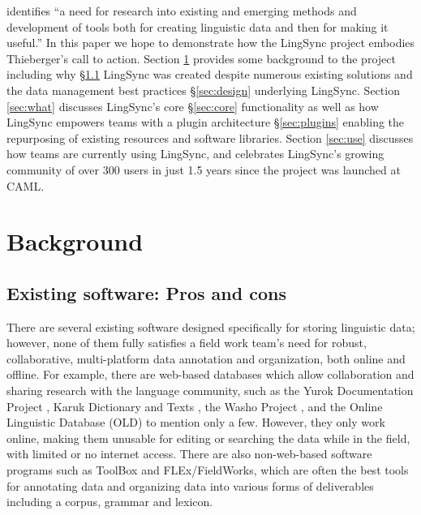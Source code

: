 \documentclass[letterpaper, 12pt, dvips]{mitwpl}
\begin{document}
\cite{Thieberger:2012} identifies ``a need for research into existing and emerging methods and development of tools both for creating linguistic data and then for making it useful.'' 
In this paper we hope to demonstrate how the LingSync project embodies Thieberger's call to action. Section \ref{sec:background} provides some background to the project including why \S \ref{sec:why} LingSync was created despite numerous existing solutions and the data management best practices \S \ref{sec:design} underlying LingSync. 
Section \ref{sec:what} discusses LingSync's core \S \ref{sec:core} functionality as well as how LingSync empowers teams  with a plugin architecture \S  \ref{sec:plugins} enabling the  repurposing of existing resources and software libraries. Section \ref{sec:use} discusses how teams are currently using LingSync, and celebrates LingSync's  growing community of over 300 users in just 1.5 years since the project was launched at CAML.


\section{Background}
\label{sec:background}



\subsection{Existing software: Pros and cons}
\label{sec:why}


There are several existing software designed specifically for storing linguistic data; however,
none of them fully satisfies a field work team's need for robust,
collaborative,
multi-platform data annotation and organization,
both online and offline.
For example,
there are web-based databases which allow collaboration and sharing research with the language community,
such as 
the Yurok Documentation Project \citep{Yurok:2001:Online},
 Karuk Dictionary and Texts \citep{Karuk:2009:Online},
the Washo Project \citep{Washo:2005:Online, WashoMobile:2008:Online, Cihlar:2008}, 
and the Online Linguistic Database (OLD) \citep{OLD:2010:Online} to mention only a few. 
However, they only work online,
making them unusable for editing or searching the data while in the field, with limited or no internet access.
There are also non-web-based software programs such as ToolBox \citep{ToolBox:2003:Online} 
and FLEx/FieldWorks,
\citep{FLEx:2011:Online}
which are often the best tools for annotating
data and organizing data into various forms of deliverables  
including a corpus,
grammar and lexicon.
\end{document}
